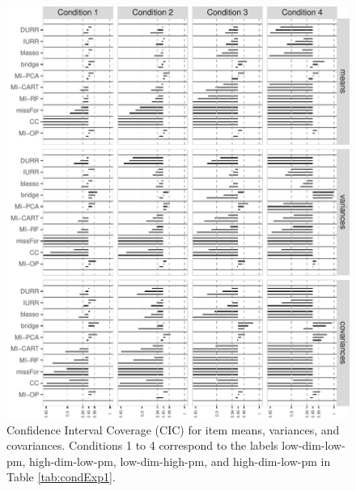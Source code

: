 \begin{figure}
\centering
\includegraphics{../../output/graphs/exp1_CI_summy.pdf}
\caption{\label{fig:exp1cir}
	Confidence Interval Coverage (CIC) for item means, variances, and covariances. 
	Conditions 1 to 4 correspond to the labels low-dim-low-pm, high-dim-low-pm, low-dim-high-pm, and 
	high-dim-low-pm in Table \ref{tab:condExp1}.
	}
\end{figure}
	

